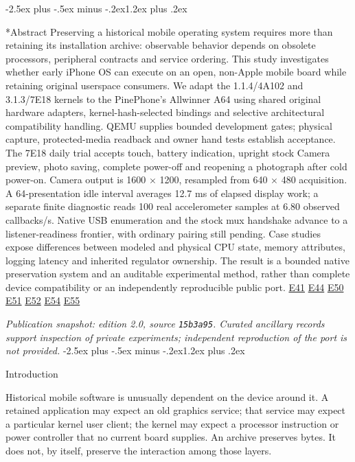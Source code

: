 \documentclass[10pt,letterpaper,twocolumn]{article}
\makeatletter
\renewcommand{\section}{\@startsection{section}{1}{0pt}
  {-2.5ex plus -.5ex minus -.2ex}{1.2ex plus .2ex}
  {\normalfont\large\bfseries\raggedright}}
\makeatother
\begin{document}
\raggedbottom
\maketitle
\section*{Abstract}
Preserving a historical mobile operating system requires more than retaining its installation archive: observable behavior depends on obsolete processors, peripheral contracts and service ordering. This study investigates whether early iPhone OS can execute on an open, non-Apple mobile board while retaining original userspace consumers. We adapt the 1.1.4/4A102 and 3.1.3/7E18 kernels to the PinePhone's Allwinner A64 using shared original hardware adapters, kernel-hash-selected bindings and selective architectural compatibility handling. QEMU supplies bounded development gates; physical capture, protected-media readback and owner hand tests establish acceptance. The 7E18 daily trial accepts touch, battery indication, upright stock Camera preview, photo saving, complete power-off and reopening a photograph after cold power-on. Camera output is 1600 \(\times\) 1200, resampled from 640 \(\times\) 480 acquisition. A 64-presentation idle interval averages 12.7 ms of elapsed display work; a separate finite diagnostic reads 100 real accelerometer samples at 6.80 observed callbacks/s. Native USB enumeration and the stock mux handshake advance to a listener-readiness frontier, with ordinary pairing still pending. Case studies expose differences between modeled and physical CPU state, memory attributes, logging latency and inherited regulator ownership. The result is a bounded native preservation system and an auditable experimental method, rather than complete device compatibility or an independently reproducible public port. \hyperlink{e-E41}{\textsf{E41}} \hyperlink{e-E44}{\textsf{E44}} \hyperlink{e-E50}{\textsf{E50}} \hyperlink{e-E51}{\textsf{E51}} \hyperlink{e-E52}{\textsf{E52}} \hyperlink{e-E54}{\textsf{E54}} \hyperlink{e-E55}{\textsf{E55}}

\noindent\textit{Publication snapshot: edition 2.0, source \texttt{15b3a95}.
Curated ancillary records support inspection of private experiments;
independent reproduction of the port is not provided.}
\section{Introduction}

Historical mobile software is unusually dependent on the device around it. A retained application may expect an old graphics service; that service may expect a particular kernel user client; the kernel may expect a processor instruction or power controller that no current board supplies. An archive preserves bytes. It does not, by itself, preserve the interaction among those layers.
\end{document}
